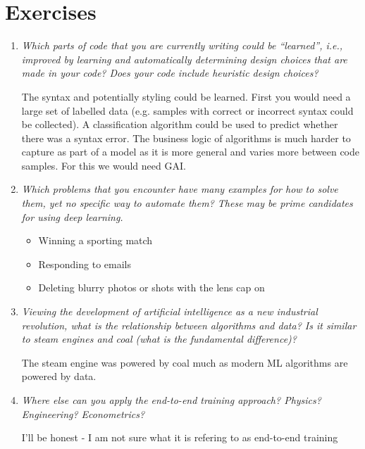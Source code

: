 \documentclass[12pt,notitlepage]{article}
\begin{document}
\section{Exercises}
\begin{enumerate}
    \item \textit{Which parts of code that you are currently writing could be “learned”, i.e.,
              improved by learning and automatically determining design choices that are made in your code? Does your code include heuristic design choices?}

          The syntax and potentially styling could be learned. First you would need a large set of labelled data (e.g. samples with correct or incorrect syntax could be collected). A classification
          algorithm could be used to predict whether there was a syntax error. The business logic of algorithms is much harder to capture
          as part of a model as it is more general and varies more between code samples. For this we would need GAI.
    \item \textit{Which problems that you encounter have many examples for how to solve them, yet no specific way to automate them? These may be prime candidates for using deep learning.}

          \begin{itemize}
              \item Winning a sporting match
              \item Responding to emails
              \item Deleting blurry photos or shots with the lens cap on
          \end{itemize}

    \item \textit{Viewing the development of artificial intelligence as a new industrial revolution, what is the relationship between algorithms and data? Is it similar to steam engines and coal (what is the fundamental difference)?}

          The steam engine was powered by coal much as modern ML algorithms are powered by data.
    \item \textit{Where else can you apply the end-to-end training approach? Physics? Engineering? Econometrics?}
          
          I'll be honest - I am not sure what it is refering to as end-to-end training
\end{enumerate}


\vfill

\nocite{LeCun2015}
\nocite{zhang2020dive}
\end{document}
